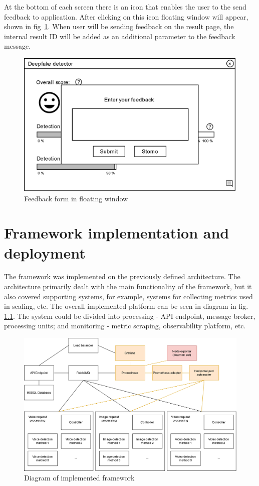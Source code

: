 At the bottom of each screen there is an icon that enables the user to the send feedback to application. After clicking on this icon floating window will appear, shown in fig~\ref{fig:client_wireframe_feedback}. When user will be sending feedback on the result page, the internal result ID will be added as an additional parameter to the feedback message. 

\begin{figure}[H]
    \centering
    \includegraphics[width=.498\linewidth]{other-fig/client_wireframe_feedback.png}
    \caption{Feedback form in floating window}
\label{fig:client_wireframe_feedback}
\end{figure}

\chapter{Framework implementation and deployment}
\label{chapter:framework_implementation}

The framework was implemented on the previously defined architecture. The architecture primarily dealt with the main functionality of the framework, but it also covered supporting systems, for example, systems for collecting metrics used in scaling, etc. The overall implemented platform can be seen in diagram in fig. \ref{fig:framework_implementation}. The system could be divided into processing - API endpoint, message broker, processing units; and monitoring - metric scraping, observability platform, etc.

\begin{figure}[H]
    \centering
    \includegraphics[width=\linewidth]{other-fig/framework_implementation.png}
    \caption{Diagram of implemented framework}
\label{fig:framework_implementation}
\end{figure}

